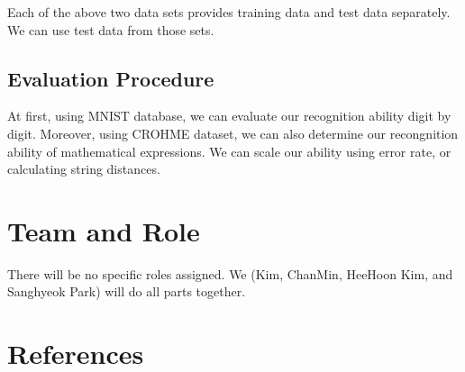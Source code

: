 \documentclass[10pt,twocolumn,letterpaper]{article}
\begin{document}
Each of the above two data sets provides training data and test data separately.
We can use test data from those sets.

\subsection{Evaluation Procedure}

At first, using MNIST database, we can evaluate our recognition ability digit by digit.
Moreover, using CROHME dataset, we can also determine our recongnition ability of mathematical expressions.
We can scale our ability using error rate, or calculating string distances.

\section{Team and Role}

There will be no specific roles assigned. We (Kim, ChanMin, HeeHoon Kim, and Sanghyeok Park) will do all parts together.

\section{References}

{\small


}
\end{document}
